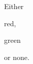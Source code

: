 \documentclass{lmcs}
\begin{document}
Either \begin{enumerate*}[label=(\alph*)]\item red, \item green\end{enumerate*} or none.
\end{document}
